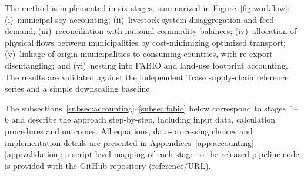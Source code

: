 \documentclass[pdflatex,sn-nature]{sn-jnl}%
\begin{document}
The method is implemented in
six stages, summarized in Figure~\ref{fig:workflow}: (i)~municipal soy
accounting; (ii)~livestock-system disaggregation and feed demand;
(iii)~reconciliation with national commodity balances; (iv)~allocation of
physical flows between municipalities by cost-minimizing optimized transport;
(v)~linkage of origin municipalities to consuming countries, with re-export
disentangling; and (vi)~nesting into FABIO and land-use footprint
accounting. The results are validated against the independent Trase
supply-chain reference series \cite{godar2015sei} and a simple downscaling baseline.

The subsections~\ref{subsec:accounting}--\ref{subsec:fabio} below correspond to
stages~1--6 and describe the approach step-by-step, including input data, calculation procedures and outcomes. All equations, data-processing choices and
implementation details are presented in
Appendices~\ref{app:accounting}--\ref{app:validation}; a script-level
mapping of each stage to the released pipeline code is provided with the GitHub
repository (reference/URL).
\end{document}
